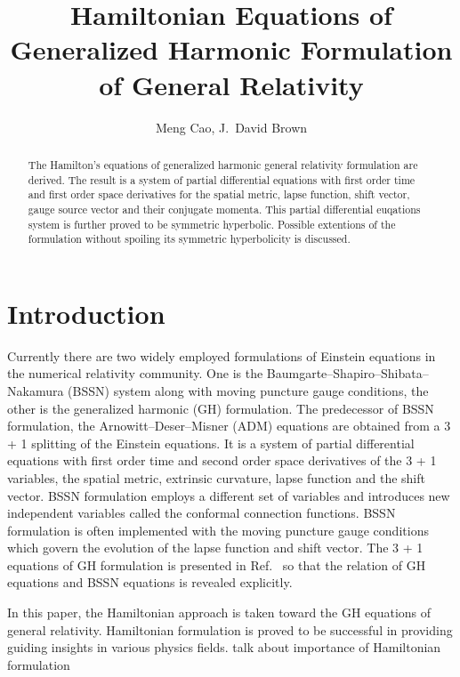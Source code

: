 \documentclass[letterpaper,nofootinbib,prd,amsmath,onecolumn]{revtex4-1}
\begin{document}

\title{Hamiltonian Equations of Generalized Harmonic Formulation of General Relativity}
\author{Meng Cao, J.~David Brown}

\begin{abstract}
The Hamilton's equations of generalized harmonic general relativity formulation are derived. The result is a system of partial differential equations with first order time and first order space derivatives for the spatial metric, lapse function, shift vector, gauge source vector and their conjugate momenta. This partial differential euqations system is further proved to be symmetric hyperbolic. Possible extentions of the formulation without spoiling its symmetric hyperbolicity is discussed. 
\end{abstract}
\maketitle
\section{Introduction}
Currently there are two widely employed formulations of Einstein equations in the numerical relativity community. One is the Baumgarte–Shapiro–Shibata–Nakamura (BSSN) system along with moving puncture gauge conditions, the other is the generalized harmonic (GH) formulation. The predecessor of BSSN formulation, the Arnowitt–Deser–Misner (ADM) equations are obtained from a 3 + 1 splitting of the Einstein equations. It is a system of partial differential equations with first order time and second order space derivatives of the 3 + 1 variables, the spatial metric, extrinsic curvature, lapse function and the shift vector. BSSN formulation employs a different set of variables and introduces new independent variables called the conformal connection functions. BSSN formulation is often implemented with the moving puncture gauge conditions which govern the evolution of the lapse function and shift vector. The 3 + 1 equations of GH formulation is presented in Ref.~\cite{Brown:2011qg} so that the relation of GH equations and BSSN equations is revealed explicitly. 

In this paper, the Hamiltonian approach is taken toward the GH equations of general relativity. Hamiltonian formulation is proved to be successful in providing guiding insights in various physics fields. {\color{red} talk about importance of Hamiltonian formulation }
\end{document}
